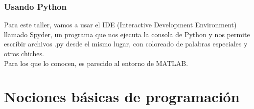 \documentclass{beamer}
\begin{document}
%    

\begin{frame}
    \frametitle{Usando Python}
    Para este taller, vamos a usar el IDE (Interactive Development Environment) llamado Spyder, un programa que nos ejecuta la consola de Python y nos permite escribir archivos .py desde el mismo lugar, con coloreado de palabras especiales y otros chiches. \\
    
    Para los que lo conocen, es parecido al entorno de MATLAB.
    
    

\end{frame}



\section{Nociones básicas de programación}
\end{document}
